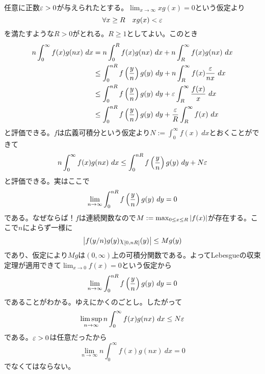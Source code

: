 \subsubsection{}%
\begin{sol}
  任意に正数${\varepsilon} > 0$が与えられたとする。$\lim_{x \to \infty} xg(x) = 0$という仮定より
  \[
  \forall x \geq R \quad x g(x) < {\varepsilon}
  \]
  を満たすような$R > 0$がとれる。$R \geq 1$としてよい。このとき
  \begin{align*}
    n \int_0^{\infty} f(x) g(nx) \ dx &= n \int_0^{R} f(x) g(nx) \ dx + n \int_R^{\infty} f(x) g(nx) \ dx \\
    &\leq \int_0^{nR} f \left( \f{y}{n} \right) g(y) \ dy +  n \int_R^{\infty} f(x) \f{ \ve }{ nx } \ dx \\
    &\leq \int_0^{nR} f \left( \f{y}{n} \right) g(y) \ dy + \ve  \int_R^{\infty}  \f{ f(x)  }{ x } \ dx \\
    &\leq \int_0^{nR} f \left( \f{y}{n} \right) g(y) \ dy + \f{ \ve}{R}  \int_R^{\infty}  f(x)  \ dx \\
  \end{align*}
  と評価できる。$f$は広義可積分という仮定より$N := \int_0^{\infty} f(x) \ dx$とおくことができて
  \[
  n \int_0^{\infty} f(x) g(nx) \ dx \leq \int_0^{nR} f \left( \frac{y}{n} \right) g(y) \ dy + N {\varepsilon}
  \]
  と評価できる。実はここで
  \[
  \lim_{n \to \infty} \int_0^{nR} f \left( \frac{y}{n} \right) g(y) \ dy = 0
  \]
  である。なぜならば！$f$は連続関数なので$M := \max_{ 0 \leq x \leq R} \left \lvert  f(x)  \right \rvert$が存在する。ここで$n$によらず一様に
  \[
  \left \lvert  f(y/n) g(y) \chi_{[0,nR]}(y)  \right \rvert \leq M g(y)
  \]
  であり、仮定により$Mg$は$(0, \infty)$上の可積分関数である。よってLebesgueの収束定理が適用できて$\lim_{x \to 0} f(x) = 0$という仮定から
  \[
\lim_{n \to \infty} \int_0^{nR} f \left( \frac{y}{n} \right) g(y) \ dy = 0
  \]
であることがわかる。ゆえにかくのごとし。したがって
\[
\limsup_{n \to \infty} n \int_0^{\infty} f(x) g(nx) \ dx \leq N {\varepsilon}
\]
である。${\varepsilon} > 0$は任意だったから
\[
\lim_{n \to \infty} n \int_0^{\infty} f(x) g(nx) \ dx = 0
\]
でなくてはならない。
\end{sol}


\newpage


